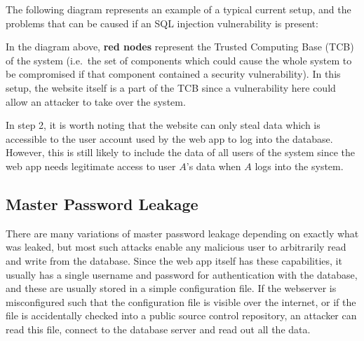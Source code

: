 \documentclass[12pt]{report}
\begin{document}
The following diagram represents an example of a typical current setup, and the problems that can be caused if an SQL injection vulnerability is present:

\begin{center}
\end{center}

In the diagram above, \textbf{red nodes} represent the Trusted Computing Base (TCB) of the system (i.e.\ the set of components which could cause the whole system to be compromised if that component contained a security vulnerability). In this setup, the website itself is a part of the TCB since a vulnerability here could allow an attacker to take over the system.

In step 2, it is worth noting that the website can only steal data which is accessible to the user account used by the web app to log into the database. However, this is still likely to include the data of all users of the system since the web app needs legitimate access to user $A$'s data when $A$ logs into the system.

\subsection{Master Password Leakage}
There are many variations of master password leakage depending on exactly what was leaked, but most such attacks enable any malicious user to arbitrarily read and write from the database. Since the web app itself has these capabilities, it usually has a single username and password for authentication with the database, and these are usually stored in a simple configuration file. If the webserver is misconfigured such that the configuration file is visible over the internet, or if the file is accidentally checked into a public source control repository, an attacker can read this file, connect to the database server and read out all the data.
\end{document}
